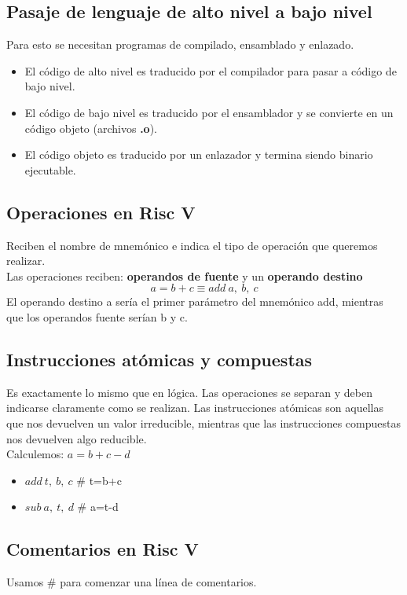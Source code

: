 \documentclass[10pt,a4paper]{article}
\begin{document}
\subsection*{Pasaje de lenguaje de alto nivel a bajo nivel}
Para esto se necesitan programas de compilado, ensamblado y enlazado.
\begin{itemize}
    \item El código de alto nivel es traducido por el compilador para pasar a código de bajo nivel.
    \item El código de bajo nivel es traducido por el ensamblador y se convierte en un código objeto (archivos \textbf{.o}).
    \item El código objeto es traducido por un enlazador y termina siendo binario ejecutable.
\end{itemize}
\subsection*{Operaciones en Risc V}
Reciben el nombre de mnemónico e indica el tipo de operación que queremos realizar. \\
Las operaciones reciben: \textbf{operandos de fuente} y un \textbf{operando destino}
\[a = b + c \equiv add \ a,\ b,\ c\]
El operando destino a sería el primer parámetro del mnemónico add, mientras que los operandos fuente serían b y c.
\subsection*{Instrucciones atómicas y compuestas}
Es exactamente lo mismo que en lógica. Las operaciones se separan y deben indicarse claramente como se realizan.
Las instrucciones atómicas son aquellas que nos devuelven un valor irreducible, mientras que las instrucciones compuestas nos devuelven algo reducible. \\
Calculemos: \(a = b + c - d\)
\begin{itemize}
    \item \(add \ t,\ b,\ c\) \# t=b+c
    \item \(sub \ a,\ t, \ d\) \# a=t-d
\end{itemize}

\subsection*{Comentarios en Risc V}
Usamos \# para comenzar una línea de comentarios.
\end{document}
